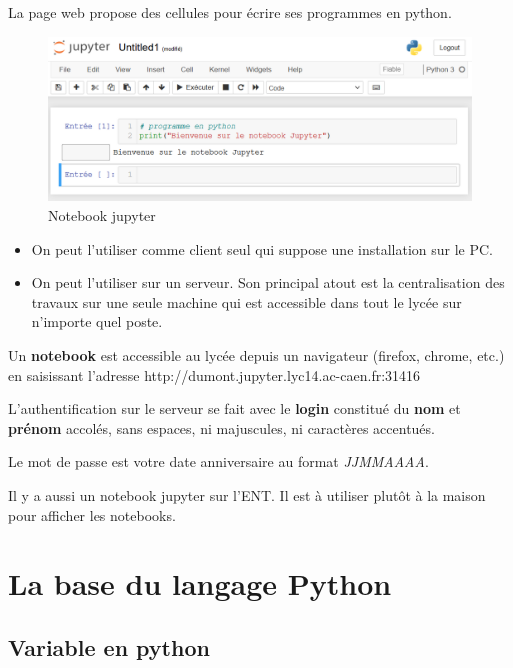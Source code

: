 \documentclass[11pt]{article}
\providecommand{\tightlist}{%
      \setlength{\itemsep}{0pt}\setlength{\parskip}{0pt}}
\begin{document}
La page web propose des cellules pour écrire ses programmes en python.

\begin{figure}
\centering
\includegraphics{img/notebook_jupyter.png}
\caption{Notebook jupyter}
\end{figure}

\begin{itemize}
\tightlist
\item
  On peut l'utiliser comme client seul qui suppose une installation sur
  le PC.
\item
  On peut l'utiliser sur un serveur. Son principal atout est la
  centralisation des travaux sur une seule machine qui est accessible
  dans tout le lycée sur n'importe quel poste.
\end{itemize}

Un \textbf{notebook} est accessible au lycée depuis un navigateur
(firefox, chrome, etc.) en saisissant l'adresse
http://dumont.jupyter.lyc14.ac-caen.fr:31416

L'authentification sur le serveur se fait avec le \textbf{login}
constitué du \textbf{nom} et \textbf{prénom} accolés, sans espaces, ni
majuscules, ni caractères accentués.

Le mot de passe est votre date anniversaire au format \emph{JJMMAAAA}.

Il y a aussi un notebook jupyter sur l'ENT. Il est à utiliser plutôt à
la maison pour afficher les notebooks.

    \hypertarget{la-base-du-langage-python}{%
\section{La base du langage Python}\label{la-base-du-langage-python}}

\hypertarget{variable-en-python}{%
\subsection{Variable en python}\label{variable-en-python}}
\end{document}
